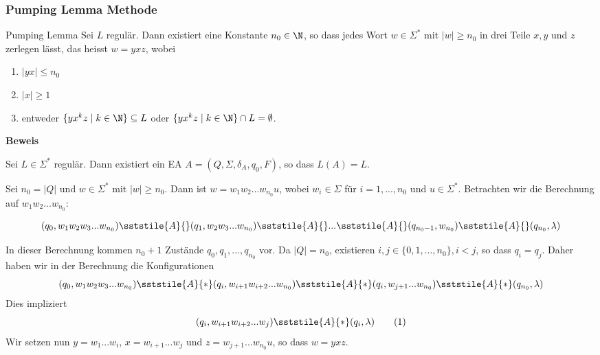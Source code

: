     \subsubsection{Pumping Lemma Methode}
    \begin{mainbox}{Pumping Lemma}
        Sei $L$ regulär. Dann existiert eine Konstante $n_0 \in \N$, so dass jedes Wort $w \in \Sigma^*$ mit $|w| \geq n_0$ in drei Teile $x, y$ und $z$ zerlegen lässt, das heisst $w = yxz$, wobei
        \begin{enumerate}[label=(\roman*)]
            \item $|yx| \leq n_0$
            \item $|x| \geq 1$
            \item entweder $\{yx^kz \mid k \in \N\} \subseteq L$ oder $\{yx^kz \mid k \in \N\} \cap L = \emptyset$.
        \end{enumerate}
    \end{mainbox}
    
    \textbf{Beweis}

    Sei $L \in \Sigma^*$ regulär. Dann existiert ein EA $A= (Q, \Sigma, \delta_A, q_0, F)$, so dass $L(A) = L$.
    
    Sei $n_0 = |Q|$ und $w \in \Sigma^*$ mit $|w| \geq n_0$. Dann ist $w = w_1w_2...w_{n_0}u$, wobei $w_i \in \Sigma$ für $i = 1, ..., n_0$ und $u \in \Sigma^*$. Betrachten wir die Berechnung auf $w_1w_2...w_{n_0}$:

    $$(q_0, w_1w_2w_3...w_{n_0}) \sststile{A}{} (q_1, w_2w_3...w_{n_0}) \sststile{A}{} ... \sststile{A}{} (q_{n_0-1}, w_{n_0}) \sststile{A}{} (q_{n_0}, \lambda)$$

    In dieser Berechnung kommen $n_0 + 1$ Zustände $q_0,q_1, ..., q_{n_0}$ vor. Da $|Q| = n_0$, existieren $i, j \in \{0, 1, ..., n_0\}, i < j$, so dass $q_i = q_j$. Daher haben wir in der Berechnung die Konfigurationen
    $$(q_0, w_1w_2w_3...w_{n_0}) \sststile{A}{*} (q_i, w_{i+1}w_{i+2}...w_{n_0}) \sststile{A}{*} (q_i, w_{j+1}...w_{n_0}) \sststile{A}{*} (q_{n_0}, \lambda)$$
    Dies impliziert
    $$(q_i, w_{i+1}w_{i+2}...w_j) \sststile{A}{*} (q_i, \lambda) \qquad (1)$$
    Wir setzen nun $y = w_1...w_i$, $x = w_{i+1}...w_j$ und $z = w_{j+1}...w_{n_0}u$, so dass $w = yxz$.

